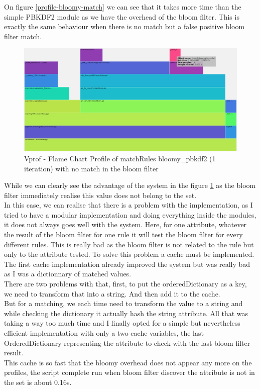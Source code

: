 \documentclass{eplmastersthesis}
\begin{document}
On figure \ref{profile-bloomy-match} we can see that it takes more time than the simple PBKDF2 module as we have the overhead of the bloom filter. This is exactly the same behaviour when there is no match but a false positive bloom filter match.\\

\begin{figure}[h!]
\begin{center}
	\includegraphics[scale=0.3]{res/match-bloom-not}
	\caption{Vprof - Flame Chart Profile of matchRules bloomy\_pbkdf2 (1 iteration) with no match in the bloom filter}
	\label{profile-bloomy-no-match}
\end{center}
\end{figure}

While we can clearly see the advantage of the system in the figure \ref{profile-bloomy-no-match} as the bloom filter immediately realise this value does not belong to the set.\\

In this case, we can realise that there is a problem with the implementation, as I tried to have a modular implementation and doing everything inside the modules, it does not always goes well with the system. Here, for one attribute, whatever the result of the bloom filter for one rule it will test the bloom filter for every different rules. This is really bad as the bloom filter is not related to the rule but only to the attribute tested. To solve this problem a cache must be implemented. The first cache implementation already improved the system but was really bad as I was a dictionnary of matched values.\\
There are two problems with that, first, to put the orderedDictionary as a key, we need to transform that into a string. And then add it to the cache.\\
But for a matching, we each time need to transform the value to a string and while checking the dictionary it actually hash the string attribute. All that was taking a way too much time and I finally opted for a simple but nevertheless efficient implementation with only a two cache variables, the last OrderedDictionary representing the attribute to check with the last bloom filter result.\\
This cache is so fast that the bloomy overhead does not appear any more on the profiles, the script complete run when bloom filter discover the attribute is not in the set is about 0.16s.\\
\end{document}
